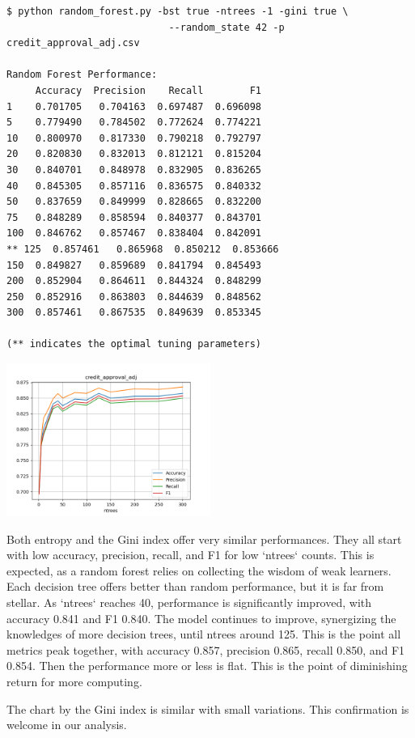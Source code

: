 \begin{verbatim}
$ python random_forest.py -bst true -ntrees -1 -gini true \
                            --random_state 42 -p credit_approval_adj.csv

Random Forest Performance: 
     Accuracy  Precision    Recall        F1
1    0.701705   0.704163  0.697487  0.696098
5    0.779490   0.784502  0.772624  0.774221
10   0.800970   0.817330  0.790218  0.792797
20   0.820830   0.832013  0.812121  0.815204
30   0.840701   0.848978  0.832905  0.836265
40   0.845305   0.857116  0.836575  0.840332
50   0.837659   0.849999  0.828665  0.832200
75   0.848289   0.858594  0.840377  0.843701
100  0.846762   0.857467  0.838404  0.842091
** 125  0.857461   0.865968  0.850212  0.853666
150  0.849827   0.859689  0.841794  0.845493
200  0.852904   0.864611  0.844324  0.848299
250  0.852916   0.863803  0.844639  0.848562
300  0.857461   0.867535  0.849639  0.853345

(** indicates the optimal tuning parameters)
\end{verbatim}

\includegraphics[width=0.5\textwidth]{./figures/rf_credit_approval_adj_gini.png}


Both entropy and the Gini index offer very similar performances. They all start with low accuracy, precision, recall, and F1  for low `ntrees` counts. This is expected, as a random forest relies on collecting the wisdom of weak learners. Each decision tree offers better than random performance, but it is far from stellar. As `ntrees` reaches 40, performance is significantly improved, with accuracy 0.841 and F1 0.840. The model continues to improve, synergizing the knowledges of more decision trees, until ntrees around 125. This is the point all metrics peak together, with accuracy 0.857, precision 0.865, recall 0.850, and F1 0.854. Then the performance more or less is flat. This is the point of diminishing return for more computing. 

The chart by the Gini index is similar with small variations. This confirmation is welcome in our analysis.


